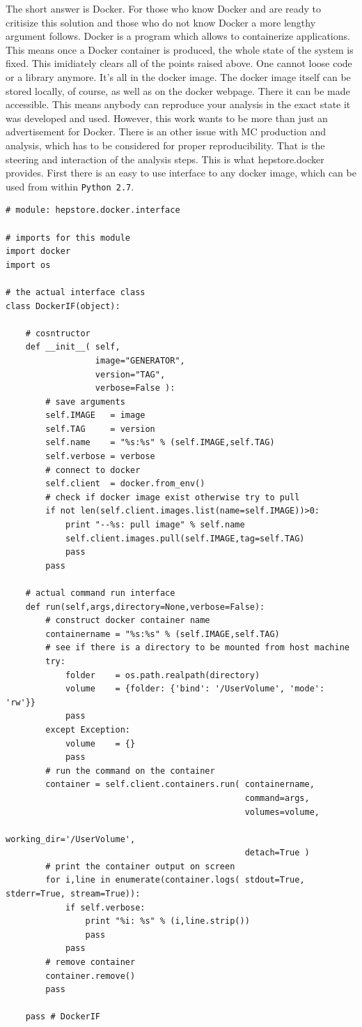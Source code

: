 \documentclass[aps,prd,11pt,tightenlines,superscriptaddress,nofootinbib,preprintnumbers,notitlepage]{revtex4-1}
\newcommand{\python}{\texttt{Python~2.7}}
\begin{document}
The short answer is Docker. For those who know Docker and are ready to critisize this solution and those who do not know Docker a more lengthy argument follows. Docker is a program which allows to containerize applications. This means once a Docker container is produced, the whole state of the system is fixed. This imidiately clears all of the points raised above. One cannot loose code or a library anymore. It's all in the docker image. The docker image itself can be stored locally, of course, as well as on the docker webpage. There it can be made accessible. This means anybody can reproduce your analysis in the exact state it was developed and used. However, this work wants to be more than just an advertisement for Docker. There is an other issue with MC production and analysis, which has to be considered for proper reproducibility. That is the steering and interaction of the analysis steps. This is what hepstore.docker provides. First there is an easy to use interface to any docker image, which can be used from within \python.
%
\begin{lstlisting}
# module: hepstore.docker.interface

# imports for this module
import docker
import os

# the actual interface class
class DockerIF(object):

    # cosntructor
    def __init__( self,
                  image="GENERATOR",
                  version="TAG",
                  verbose=False ):
        # save arguments
        self.IMAGE   = image
        self.TAG     = version
        self.name    = "%s:%s" % (self.IMAGE,self.TAG)
        self.verbose = verbose
        # connect to docker
        self.client  = docker.from_env()
        # check if docker image exist otherwise try to pull
        if not len(self.client.images.list(name=self.IMAGE))>0:
            print "--%s: pull image" % self.name
            self.client.images.pull(self.IMAGE,tag=self.TAG)
            pass
        pass

    # actual command run interface
    def run(self,args,directory=None,verbose=False):
        # construct docker container name
        containername = "%s:%s" % (self.IMAGE,self.TAG)
        # see if there is a directory to be mounted from host machine
        try:
            folder    = os.path.realpath(directory)
            volume    = {folder: {'bind': '/UserVolume', 'mode': 'rw'}}
            pass
        except Exception:
            volume    = {}
            pass
        # run the command on the container
        container = self.client.containers.run( containername,
                                                command=args,
                                                volumes=volume,
                                                working_dir='/UserVolume',
                                                detach=True )
        # print the container output on screen
        for i,line in enumerate(container.logs( stdout=True, stderr=True, stream=True)):
            if self.verbose:
                print "%i: %s" % (i,line.strip())
                pass
            pass
        # remove container
        container.remove()
        pass

    pass # DockerIF
\end{lstlisting}
%
\end{document}
